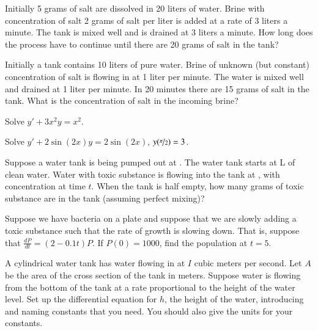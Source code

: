 \documentclass[12pt]{book}
\begin{document}
\begin{exercise}
Initially 5 grams of salt are dissolved in 20 liters of water.  Brine
with concentration of salt 2 grams of salt per liter is added at a rate
of 3 liters a minute.  The tank is mixed well and is drained at 3 liters
a minute.  How long does the process have to continue until there are 20 grams
of salt in the tank?
\end{exercise}

\begin{exercise}
Initially a tank contains 10 liters of pure water.
Brine of unknown (but constant) concentration
of salt is flowing in at 1 liter per minute.
The water is mixed well and drained at 1 liter per minute.
In 20 minutes there are 15 grams of salt in the tank.  What is the
concentration of salt in the incoming brine?
\end{exercise}

\setcounter{exercise}{100}

\begin{exercise}
Solve $y'+3 x^2 y = x^2$.
\end{exercise}

\begin{exercise}
Solve $y'+ 2\sin(2x) y = 2\sin(2x)$, $y(\nicefrac{\pi}{2}) = 3$.
\end{exercise}

\begin{exercise}
Suppose a water tank is being pumped out at .  The
water tank starts at \unit[10]{L} of clean water.
Water with
toxic substance is flowing into the tank at ,
with concentration  at time $t$.
When the tank is half empty, how many grams of toxic substance are in the
tank (assuming perfect mixing)?
\end{exercise}

\begin{exercise}
Suppose we have bacteria on a plate and suppose that we are slowly adding
a toxic substance such that the rate of growth is slowing down.  That is,
suppose that $\frac{dP}{dt} = (2-0.1t)P$.  If $P(0) = 1000$, find
the population at $t=5$.
\end{exercise}

\begin{exercise}
A cylindrical water tank has water flowing in at $I$ cubic meters
per second.
Let $A$ be the area of the cross section of the tank in meters.
Suppose water is
flowing from the bottom of the tank at a rate proportional to the height of
the water level.  Set up the differential equation for $h$, the height of the
water, introducing and naming
constants that you need.  You should also give the units for your constants.
\end{exercise}
\end{document}
